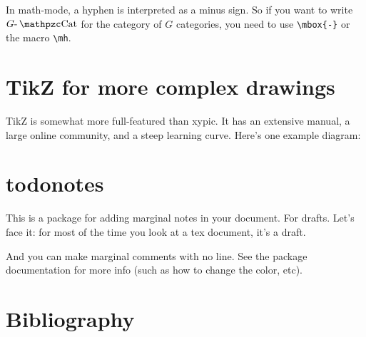 \documentclass[11pt,oneside,draft]{amsart}
\begin{document}
In math-mode, a hyphen is interpreted as a minus sign.  So if you want
to write $G\mh\Cat$ for the category of $G$ categories, you need to
use \verb|\mbox{-}| or the macro \verb|\mh|.


\section{TikZ for more complex drawings}

TikZ is somewhat more full-featured than xypic.  It has an extensive
manual, a large online community, and a steep learning curve.  Here's one
example diagram:

\begin{center}
\end{center}

\section{todonotes}
This is a package for adding  marginal notes in
your document.  For drafts.  Let's face it: for most of the time you
look at a tex document, it's a draft.

And you can make marginal comments with no line.  See the package
documentation for more info (such as how to change the color, etc).

\section{Bibliography}
\end{document}
